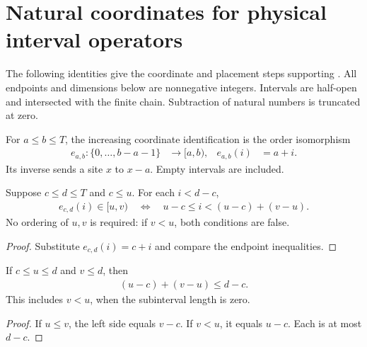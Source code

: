 \section{Natural coordinates for physical interval operators}

The following identities give the coordinate and placement steps supporting
\cite[Proposition~5.7]{Arad2016RigorousRG}. All endpoints and dimensions below
are nonnegative integers. Intervals are half-open and intersected with the
finite chain. Subtraction of natural numbers is truncated at zero.

\begin{definition}
    \label{def:physical_interval_increasing_coordinates}
    \leanok
    For $a\le b\le T$, the increasing coordinate identification is the
    order isomorphism
    \begin{align}
        e_{a,b}:\{0,\ldots,b-a-1\} & \longrightarrow[a,b), &
        e_{a,b}(i)                 & =a+i.
        \label{eq:physical_interval_increasing_coordinates}
    \end{align}
    Its inverse sends a site $x$ to $x-a$. Empty intervals are included.
\end{definition}

\begin{lemma}
    \label{thm:physical_interval_subinterval_coordinates}
    \leanok
    Suppose $c\le d\le T$ and $c\le u$. For each $i<d-c$,
    \begin{align}
        e_{c,d}(i)\in[u,v)
        \quad\Longleftrightarrow\quad
        u-c\le i<(u-c)+(v-u).
        \label{eq:physical_interval_subinterval_coordinates}
    \end{align}
    No ordering of $u,v$ is required: if $v<u$, both conditions are false.
\end{lemma}
\begin{proof}\leanok
    Substitute $e_{c,d}(i)=c+i$ and compare the endpoint inequalities.
\end{proof}

\begin{lemma}
    \label{thm:physical_interval_subinterval_length}
    \leanok
    If $c\le u\le d$ and $v\le d$, then
    \begin{align}
        (u-c)+(v-u)\le d-c.
        \label{eq:physical_interval_subinterval_length}
    \end{align}
    This includes $v<u$, when the subinterval length is zero.
\end{lemma}
\begin{proof}\leanok
    If $u\le v$, the left side equals $v-c$. If $v<u$, it equals $u-c$.
    Each is at most $d-c$.
\end{proof}

